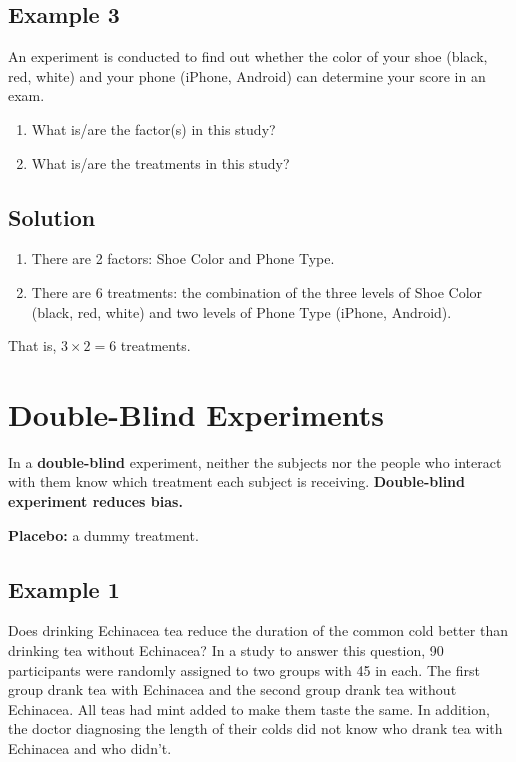 \subsection*{Example 3}

An experiment is conducted to find out whether the color of your shoe (black, red, white) and your phone (iPhone, Android) can determine your score in an exam.

\begin{enumerate}
    \item What is/are the factor(s) in this study?
    \item What is/are the treatments in this study?
\end{enumerate}

\subsection*{Solution}

\begin{enumerate}
    \item There are 2 factors: Shoe Color and Phone Type.
    \item There are 6 treatments: the combination of the three levels of Shoe Color (black, red, white) and two levels of Phone Type (iPhone, Android).
\end{enumerate}

That is, $3 \times 2 = 6$ treatments.

 
\section{Double-Blind Experiments}

In a \textbf{double-blind} experiment, neither the subjects nor the people who interact with them know which treatment each subject is receiving. \textbf{Double-blind experiment reduces bias.}

\textbf{Placebo:} a dummy treatment.

\subsection*{Example 1}

Does drinking Echinacea tea reduce the duration of the common cold better than drinking tea without Echinacea? In a study to answer this question, 90 participants were randomly assigned to two groups with 45 in each. The first group drank tea with Echinacea and the second group drank tea without Echinacea. All teas had mint added to make them taste the same. In addition, the doctor diagnosing the length of their colds did not know who drank tea with Echinacea and who didn't.

